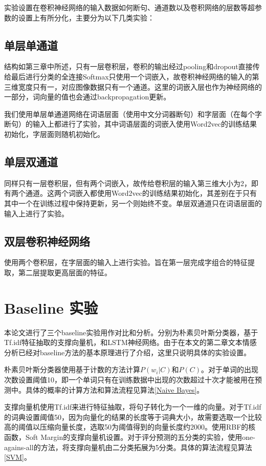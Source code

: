 实验设置在卷积神经网络的输入数据如何断句、通道数以及卷积网络的层数等超参数的设置上有所分化，主要分为以下几类实验：
\subsection{单层单通道}
结构如第三章中所述，只有一层卷积层，卷积的输出经过pooling和dropout直接传给最后进行分类的全连接Softmax只使用一个词嵌入，故卷积神经网络的输入的第三维宽度只有一，对应图像数据只有一个通道。这里的词嵌入层也作为神经网络的一部分，词向量的值也会通过backpropagation更新。

我们使用单层单通道网络在词语层面（使用中文分词器断句）和字层面（在每个字断句）的输入上都进行了实验，其中词语层面的词嵌入使用Word2vec的训练结果初始化，字层面则随机初始化。

\subsection{单层双通道}
同样只有一层卷积层，但有两个词嵌入，故传给卷积层的输入第三维大小为2，即有两个通道。这两个词嵌入都使用Word2vec的训练结果初始化，其差别在于只有其中一个在训练过程中保持更新，另一个则始终不变。单层双通道只在词语层面的输入上进行了实验。

\subsection{双层卷积神经网络}
使用两个卷积层，在字层面的输入上进行实验。旨在第一层完成字组合的特征提取，第二层提取更高层面的特征。

\section{Baseline 实验}
本论文进行了三个baseline实验用作对比和分析。分别为朴素贝叶斯分类器，基于Tf.idf特征抽取的支撑向量机，和LSTM神经网络。由于在本文的第二章文本情感分析已经对baseline方法的基本原理进行了介绍，这里只说明具体的实验设置。

朴素贝叶斯分类器使用基于计数的方法计算$P(w_i|C)$和$P(C)$。对于单词的出现次数设置阈值10，即一个单词只有在训练数据中出现的次数超过十次才能被用在预测中。具体的概率的计算方法和算法流程见算法\ref{Naive Bayes}。

支撑向量机使用Tf.idf来进行特征抽取，将句子转化为一个一维的向量。对于Tf.idf的词典设置阈值50，因为向量化的结果的长度等于词典大小，故需要选取一个比较高的阈值以压缩向量长度，选取50为阈值得到的向量长度约2000。使用RBF的核函数，Soft Margin的支撑向量机设置。对于评分预测的五分类的实验，使用one-agains-all的方法，将支撑向量机由二分类拓展为5分类。具体的算法流程见算法\ref{SVM}。

